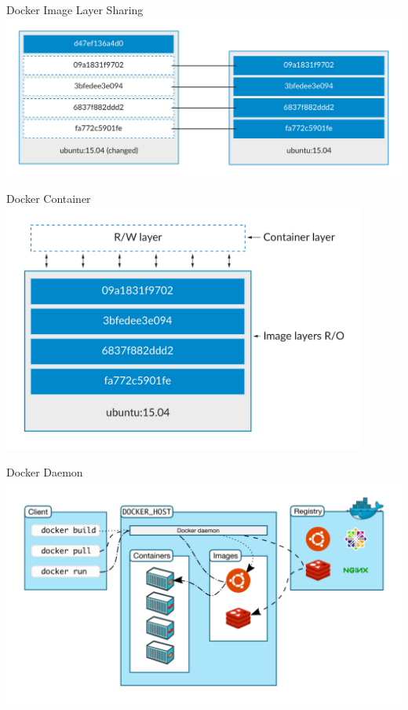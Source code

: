 \documentclass[10pt]{beamer}
\begin{document}
\begin{frame}{Docker Image Layer Sharing}
  \includegraphics[width=1\textwidth]{../images/10-docker-image-layer-sharing.png}
\end{frame}

\begin{frame}{Docker Container}
  \center
  \includegraphics[width=0.9\textwidth]{../images/11-docker-container.png}
\end{frame}

\begin{frame}{Docker Daemon}
  \includegraphics[width=1\textwidth]{../images/12-docker-daemon.png}
\end{frame}
\end{document}

